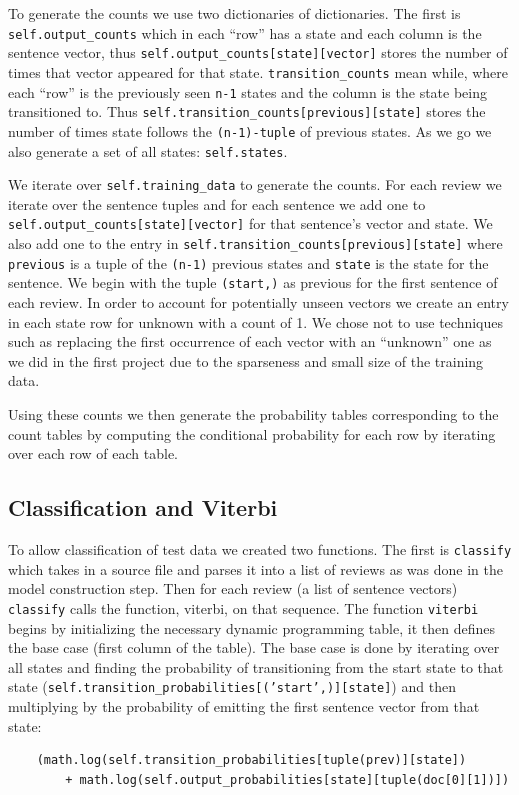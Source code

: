 \documentclass{article}
\begin{document}
To generate the counts we use two dictionaries of dictionaries. The first is \texttt{self.output\_counts} which in each ``row'' has a state and each column is the sentence vector, thus \texttt{self.output\_counts[state][vector]} stores the number of times that vector appeared for that state. \texttt{transition\_counts} mean while, where each ``row'' is the previously seen \texttt{n-1} states and the column is the state being transitioned to. Thus \texttt{self.transition\_counts[previous][state]} stores the number of times state follows the \texttt{(n-1)-tuple} of previous states. As we go we also generate a set of all states: \texttt{self.states}.

We iterate over \texttt{self.training\_data} to generate the counts. For each review we iterate over the sentence tuples and for each sentence we add one to \texttt{self.output\_counts[state][vector]} for that sentence's vector and state. We also add one to the entry in  \texttt{self.transition\_counts[previous][state]} where \texttt{previous} is a tuple of the \texttt{(n-1)} previous states and \texttt{state} is the state for the sentence. We begin with the tuple \texttt{(start,)} as previous for the first sentence of each review. In order to account for potentially unseen vectors we create an entry in each state row for unknown with a count of 1. We chose not to use techniques such as replacing the first occurrence of each vector with an ``unknown'' one as we did in the first project due to the sparseness and small size of the training data. 

Using these counts we then generate the probability tables corresponding to the count tables by computing the conditional probability for each row by iterating over each row of each table.
 
\subsection{Classification and Viterbi}
To allow classification of test data we created two functions. The first is \texttt{classify} which takes in a source file and parses it into a list of reviews as was done in the model construction step. Then for each review (a list of sentence vectors) \texttt{classify} calls the function, viterbi, on that sequence. The function \texttt{viterbi} begins by initializing the necessary dynamic programming table, it then defines the base case (first column of the table). The base case is done by iterating over all states and finding the probability of transitioning from the start state to that state (\texttt{self.transition\_probabilities[('start',)][state]}) and then multiplying by the probability of emitting the first sentence vector from that state:
\begin{verbatim}
    (math.log(self.transition_probabilities[tuple(prev)][state])
        + math.log(self.output_probabilities[state][tuple(doc[0][1])])
\end{verbatim}
\end{document}
